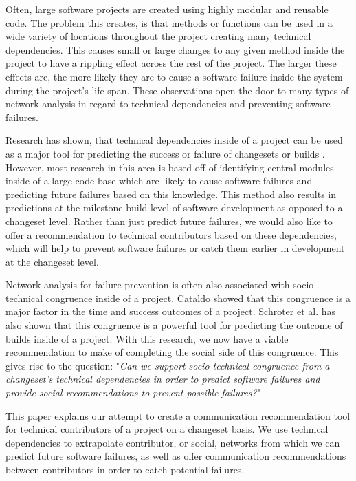\documentclass[conference]{IEEEtran}
\begin{document}
Often, large software projects are created using highly modular and 
reusable code. The problem this creates, is that methods or functions can be used in a wide
variety of locations throughout the project creating many technical dependencies. 
This causes small or large changes to any given method inside the project to have a rippling 
effect across the rest of the project\cite{Acharya:2011:PCI}. The larger these effects are,
the more likely they are to cause a software failure inside the system during the project's
life span\cite{Zimmermann:2008:PDU}. These observations open the door to many types
of network analysis in regard to technical dependencies and preventing software failures.

Research has shown, that technical dependencies inside of a project can be used as a major
tool for predicting the success or failure of changesets or builds \cite{Pinzger:2008:DNP}
\cite{Zimmermann:2008:PDU}. However, most research in this area is based off of identifying
central modules inside of a large code base which are likely to cause software failures and 
predicting future failures based on this knowledge. This method also results in predictions 
at the milestone build level of software development as opposed to a changeset level.
Rather than just predict future failures, we would also like to offer a recommendation to 
technical contributors based on these dependencies, which will help to prevent software failures
or catch them earlier in development at the changeset level.

Network analysis for failure prevention is often also associated with socio-technical congruence
inside of a project. Cataldo \cite{Cataldo:2006:ICR} showed that this congruence is a major factor in the time
and success outcomes of a project. Schroter et al. \cite{Schroter:2010:PBO}
has also shown that this congruence is a powerful tool for predicting the outcome of builds
inside of a project. With this research, we now have a viable recommendation to make of completing
the social side of this congruence. This gives rise to the question: "\textit{Can we support socio-technical
congruence from a changeset's technical dependencies in order to predict software failures and
provide social recommendations to prevent possible failures?}"

This paper explains our attempt to create a communication recommendation tool for technical
contributors of a project on a changeset basis. We use technical dependencies to extrapolate
contributor, or social, networks from which we can predict future software failures, as well as
offer communication recommendations between contributors in order to catch potential
failures. 
\end{document}
